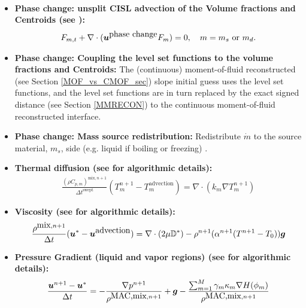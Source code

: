 \documentclass[]{article}
\newcommand{\bmg}{\mbox{\boldmath $g$\unboldmath}}
\newcommand{\bmu}{\mbox{\boldmath $u$\unboldmath}}
\newcommand{\DefTen}{\mathbb{D}}
\begin{document}
\begin{itemize}
\begin{eqnarray*}
  \end{eqnarray*}
\item \textbf{Phase change: unsplit CISL advection of the Volume fractions and Centroids
  (see \cite{VAHAB2021,liu2022novel}):}
  \begin{eqnarray*}
  F_{m,t}+\nabla\cdot(\bmu^{\mbox{phase change}}F_{m})=0,
  \hspace{10pt} m=m_{s} \mbox{ or } m_{d}.
  \end{eqnarray*}
\item \textbf{Phase change: Coupling the level set functions to the volume fractions and Centroids:} 
  The (continuous) 
  moment-of-fluid reconstructed
  (see Section \ref{MOF_vs_CMOF_sec}) 
  slope initial guess uses the level set functions,
  and the level set functions are in turn replaced by the exact 
  signed distance (see Section \ref{MMRECON}) 
  to the continuous moment-of-fluid reconstructed
  interface.
\item \textbf{Phase change: Mass source redistribution:} 
  Redistribute $\dot{m}$ to the
  source material, $m_{s}$, side (e.g. liquid if boiling or 
  freezing) \cite{VAHAB2021}.
\item \textbf{Thermal diffusion
  (see \cite{VAHAB2021} for algorithmic details):}
  \begin{eqnarray}
  \frac{(\rho C_{p,m})^{\mbox{mix},n+1}}{\Delta t^{\mbox{swept}}}
  (T^{n+1}_{m}-T^{\mbox{advection}}_{m})=
   \nabla\cdot (k_{m} \nabla T^{n+1}_{m})
  \label{diffusion1}
  \end{eqnarray}
\item \textbf{Viscosity
  (see \cite{pei2019hierarchical} for algorithmic details):}
  \begin{eqnarray}
	  \frac{\rho^{\mbox{mix},n+1}}{\Delta t}
	  (\bmu^{\ast}-\bmu^{\mbox{advection}})=
	  \nabla\cdot(2\mu\DefTen^{\ast})-
	  \rho^{n+1}(\alpha^{n+1}(T^{n+1}-T_{0}))\bmg
	  \label{diffusion3}
  \end{eqnarray}
\item \textbf{Pressure Gradient (liquid and vapor regions)
  (see 
  \cite{jemison2014compressible,li2015multiphase,pei2019hierarchical,VAHAB2021} 
  for algorithmic details):}
  \begin{eqnarray}
  \frac{\bmu^{n+1}-\bmu^{\ast}}{\Delta t}=
    -\frac{\nabla p^{n+1}}{\rho^{\mbox{MAC,mix},n+1}}+\bmg-
    \frac{\sum_{m=1}^{M} \gamma_{m}\kappa_{m}\nabla H(\phi_{m})}
         {\rho^{\mbox{MAC,mix},n+1}}
	  \label{pressuregrad}
  \end{eqnarray}
  \begin{eqnarray*}

\end{eqnarray*}
\end{itemize}
\end{document}
